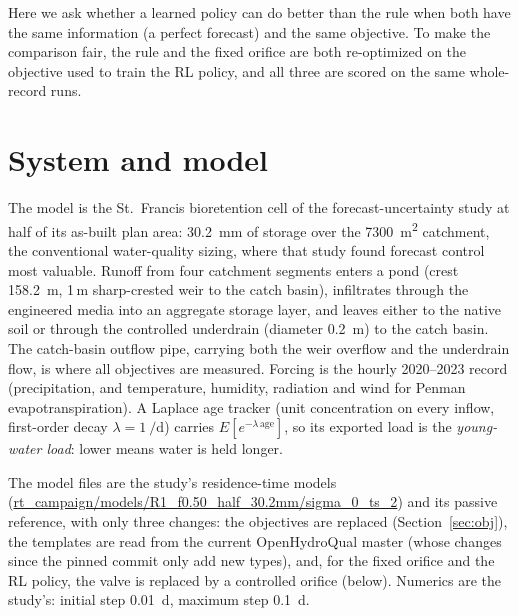 \documentclass[11pt]{article}
\begin{document}
Here we ask whether a learned policy can do better than the rule when both have the same
information (a perfect forecast) and the same objective. To make the comparison fair, the
rule and the fixed orifice are both re-optimized on the objective used to train the RL
policy, and all three are scored on the same whole-record runs.

\section{System and model}
The model is the St.\ Francis bioretention cell of the forecast-uncertainty study at half
of its as-built plan area: \SI{30.2}{mm} of storage over the \SI{7300}{\m^2} catchment, the
conventional water-quality sizing, where that study found forecast control most valuable.
Runoff from four catchment segments enters a pond (crest \SI{158.2}{m}, 1\,m sharp-crested
weir to the catch basin), infiltrates through the engineered media into an aggregate
storage layer, and leaves either to the native soil or through the controlled underdrain
(diameter \SI{0.2}{m}) to the catch basin. The catch-basin outflow pipe, carrying both the
weir overflow and the underdrain flow, is where all objectives are measured. Forcing is the
hourly 2020--2023 record (precipitation, and temperature, humidity, radiation and wind for
Penman evapotranspiration). A Laplace age tracker (unit concentration on every inflow,
first-order decay $\lambda = \SI{1}{\per\day}$) carries $E[e^{-\lambda\,\mathrm{age}}]$, so its
exported load is the \emph{young-water load}: lower means water is held longer.

The model files are the study's residence-time models
(\url{rt_campaign/models/R1_f0.50_half_30.2mm/sigma_0_ts_2}) and its passive
reference, with only three changes: the objectives are replaced (Section~\ref{sec:obj}), the
templates are read from the current OpenHydroQual master (whose changes since the pinned
commit only add new types), and, for the fixed orifice and the RL policy, the valve is
replaced by a controlled orifice (below). Numerics are the study's: initial step
\SI{0.01}{d}, maximum step \SI{0.1}{d}.
\end{document}
